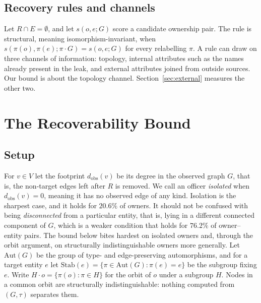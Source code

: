 \documentclass[sigconf]{acmart}
\begin{document}
\subsection{Recovery rules and channels}
Let $R\cap E=\emptyset$, and let $s(o,e;G)$ score a candidate ownership pair. The
rule is structural, meaning isomorphism-invariant, when
$s(\pi(o),\pi(e);\pi\!\cdot\!G)=s(o,e;G)$ for every relabelling $\pi$. A rule can
draw on three channels of information: topology, internal attributes such as the
names already present in the leak, and external attributes joined from outside
sources. Our bound is about the topology channel. Section~\ref{sec:external}
measures the other two.

\section{The Recoverability Bound}\label{sec:bound}
\subsection{Setup}
For $v\in V$ let the footprint $d_{\mathrm{obs}}(v)$ be its degree in the observed
graph $G$, that is, the non-target edges left after $R$ is removed. We call an
officer \emph{isolated} when $d_{\mathrm{obs}}(v)=0$, meaning it has no observed
edge of any kind. Isolation is the sharpest case, and it holds for $20.6\%$ of
owners. It should not be confused with being \emph{disconnected} from a
particular entity, that is, lying in a different connected component of $G$, which
is a weaker condition that holds for $76.2\%$ of owner--entity pairs. The bound
below bites hardest on isolated owners and, through the orbit argument, on
structurally indistinguishable owners more generally. Let $\mathrm{Aut}(G)$ be the
group of type- and edge-preserving automorphisms, and for a target entity $e$ let
$\mathrm{Stab}(e)=\{\pi\in\mathrm{Aut}(G):\pi(e)=e\}$ be the subgroup fixing $e$.
Write $H\!\cdot\!o=\{\pi(o):\pi\in H\}$ for the orbit of $o$ under a subgroup $H$.
Nodes in a common orbit are structurally indistinguishable: nothing computed from
$(G,\tau)$ separates them.
\end{document}
